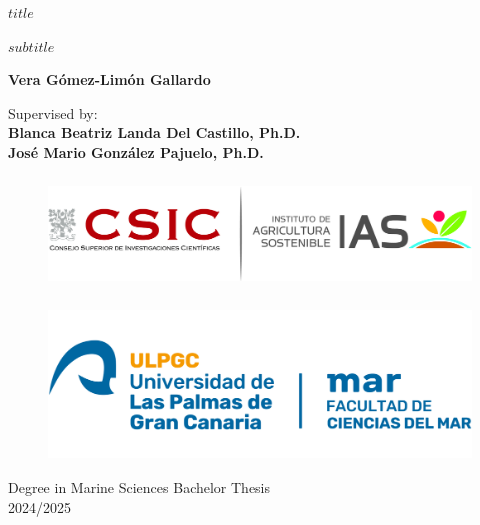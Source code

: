 %
%
%
% 


\begin{center}
    \Huge
    \textbf{$title$}
        
    \vspace{0.5cm}
    \LARGE
    \textit{$subtitle$}
        
    \vspace{0.5cm}
    \textbf{Vera Gómez-Limón Gallardo}
        
    \vspace{0.5cm}
    \Large
    Supervised by:\\
    \textbf{Blanca Beatriz Landa Del Castillo, Ph.D.\\José Mario González Pajuelo, Ph.D.}
        
    \vspace{0.5cm}
    \begin{figure}[h]
      \centering
      \includegraphics[height=3cm]{images/logo-ias-csic.jpg}
    \end{figure}
    \begin{figure}[h]
      \centering
      \includegraphics[height=4cm]{images/logo-ulpgc.png}
    \end{figure}
    
    \vfill
    Degree in Marine Sciences Bachelor Thesis\\2024/2025
        
\end{center}
	
	